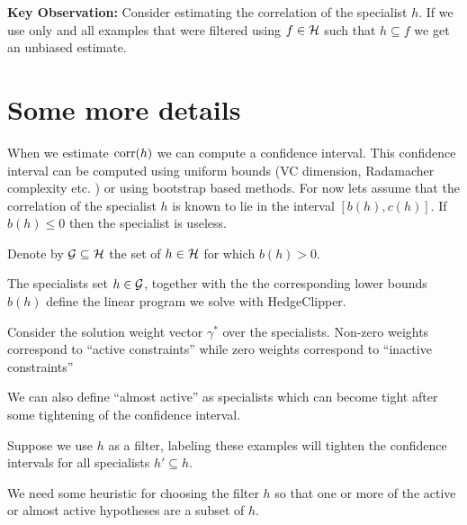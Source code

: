 \documentclass{article}[12pt]
\begin{document}
{\bf Key Observation:} Consider estimating the correlation of the
specialist $h$. If we use only and all examples that were filtered
using $f \in {\cal H}$ such that $h \subseteq f$ we get an unbiased
estimate.

\section{Some more details}

When we estimate $\mbox{corr}(h)$ we can compute a confidence interval. This
confidence interval can be computed using uniform bounds (VC
dimension, Radamacher complexity etc. ) or using bootstrap based
methods. For now lets assume that the correlation of the specialist
$h$ is known to lie in the interval $[b(h),c(h)]$. If $b(h)\leq 0$
then the specialist is useless.

Denote by ${\cal G} \subseteq {\cal H}$ the set of $h \in {\cal H}$ for which
$b(h)>0$.

The specialists set $h \in {\cal G}$, together with the the corresponding
lower bounds $b(h)$ define the linear program we solve with
HedgeClipper.

Consider the solution weight vector $\gamma^*$ over the
specialists. Non-zero weights correspond to ``active constraints''
while zero weights correspond to ``inactive constraints''

We can also define ``almost active'' as specialists which can become
tight after some tightening of the confidence interval.

Suppose we use $h$ as a filter, labeling these examples will tighten
the confidence intervals for all specialists $h' \subseteq h$. 

We need some heuristic for choosing the filter $h$ so that one or more
of the active or almost active hypotheses are a subset of $h$.
\end{document}
